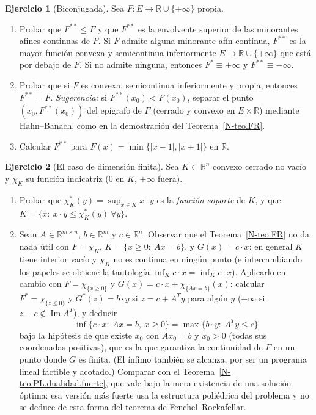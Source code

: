 \documentclass[11pt,a4paper]{amsart}
\newcounter{chapter}
\newcommand{\R}{{\mathbb R}}
\theoremstyle{remark}
\theoremstyle{definition}
\newtheorem{ejercicio}{Ejercicio}[chapter]
\numberwithin{subsection}{section}
\numberwithin{equation}{section}
\begin{document}
\begin{ejercicio}[Biconjugada]\label{ejer.FR.biconjugada}
Sea $F\colon E\to\R\cup\{+\infty\}$ propia.
\begin{enumerate}[label=(\alph*)]
\item Probar que $F^{**}\le F$ y que $F^{**}$ es la envolvente superior de
las minorantes afines continuas de $F$. Si $F$ admite alguna minorante afín
continua, $F^{**}$ es la mayor función convexa y semicontinua inferiormente
$E\to\R\cup\{+\infty\}$ que está por debajo de $F$. Si no admite ninguna,
entonces $F^*\equiv+\infty$ y $F^{**}\equiv-\infty$.
\item Probar que si $F$ es convexa, semicontinua inferiormente y propia,
entonces $F^{**}=F$. \emph{Sugerencia:} si $F^{**}(x_0)<F(x_0)$, separar el
punto $(x_0,F^{**}(x_0))$ del epígrafo de $F$ (cerrado y convexo en
$E\times\R$) mediante Hahn--Banach, como en la demostración del
Teorema~\ref{N-teo.FR}.
\item Calcular $F^{**}$ para $F(x)=\min\{|x-1|,|x+1|\}$ en $\R$.
\end{enumerate}
\end{ejercicio}

\begin{ejercicio}[El caso de dimensión finita]\label{ejer.FR.dimension.finita}
Sea $K\subset\R^n$ convexo cerrado no vacío y $\chi_K$ su función indicatriz
($0$ en $K$, $+\infty$ fuera).
\begin{enumerate}[label=(\alph*)]
\item Probar que $\chi_K^*(y)=\sup_{x\in K}x\cdot y$ es la \emph{función
soporte} de $K$, y que $K=\{x:\ x\cdot y\le\chi_K^*(y)\ \forall y\}$.
\item Sean $A\in\R^{m\times n}$, $b\in\R^m$ y $c\in\R^n$. Observar que el
Teorema~\ref{N-teo.FR} no da nada útil con $F=\chi_K$,
$K=\{x\ge0:\ Ax=b\}$, y $G(x)=c\cdot x$: en general $K$ tiene interior vacío
y $\chi_K$ no es continua en ningún punto (e intercambiando los papeles se
obtiene la tautología $\inf_Kc\cdot x=\inf_Kc\cdot x$). Aplicarlo en cambio con
$F=\chi_{\{x\ge0\}}$ y $G(x)=c\cdot x+\chi_{\{Ax=b\}}(x)$: calcular
$F^*=\chi_{\{z\le0\}}$ y $G^*(z)=b\cdot y$ si $z=c+A^Ty$ para algún $y$
($+\infty$ si $z-c\notin\operatorname{Im}A^T$), y deducir
\[
\inf\{c\cdot x:\ Ax=b,\ x\ge0\}=\max\{b\cdot y:\ A^Ty\le c\}
\]
bajo la hipótesis de que existe $x_0$ con $Ax_0=b$ y $x_0>0$ (todas sus
coordenadas positivas), que es la que garantiza la continuidad de $F$ en
un punto donde $G$ es finita. (El ínfimo también se alcanza, por ser un
programa lineal factible y acotado.) Comparar con el
Teorema~\ref{N-teo.PL.dualidad.fuerte}, que vale bajo la mera existencia de una
solución óptima: esa versión más fuerte usa la estructura poliédrica del
problema y no se deduce de esta forma del teorema de Fenchel--Rockafellar.
\end{enumerate}
\end{ejercicio}
\end{document}
